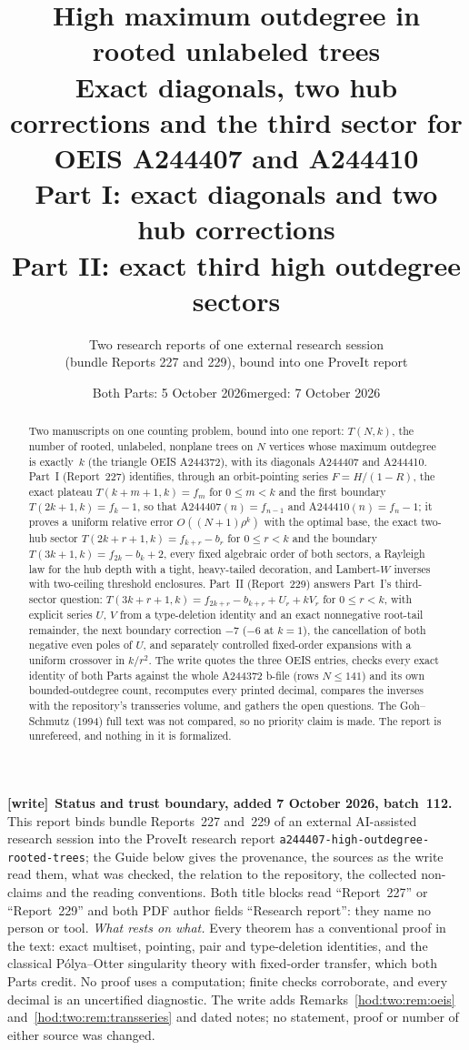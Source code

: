 \documentclass[11pt,letterpaper]{article}
\title{High maximum outdegree in rooted unlabeled trees\\[4pt]\large Exact diagonals, two hub corrections and the third sector for OEIS A244407 and A244410\\[8pt]
\normalsize Part I: exact diagonals and two hub corrections\\[2pt]
Part II: exact third high outdegree sectors}
\author{Two research reports of one external research session\\(bundle Reports 227 and 229), bound into one ProveIt report}
\date{Both Parts: 5 October 2026\quad merged: 7 October 2026}
\theoremstyle{definition}\newtheorem{definition}[theorem]{Definition}
\theoremstyle{remark}\newtheorem{remark}[theorem]{Remark}
\newcommand{\file}[1]{\nolinkurl{#1}}
\newenvironment{writenote}[1][]{\par\smallskip\begingroup\small
 \noindent\textbf{[write]}\if\relax\detokenize{#1}\relax\else~\textbf{#1.}\fi\ }%
 {\par\endgroup\smallskip}
\begin{document}
\hypersetup{pageanchor=false}
\maketitle
\begin{abstract}
Two manuscripts on one counting problem, bound into one report: $T(N,k)$, the number of rooted, unlabeled, nonplane trees on $N$ vertices whose maximum outdegree is exactly~$k$ (the triangle OEIS A244372), with its diagonals A244407 and A244410. Part~I (Report~227) identifies, through an orbit-pointing series $F=H/(1-R)$, the exact plateau $T(k+m+1,k)=f_m$ for $0\le m<k$ and the first boundary $T(2k+1,k)=f_k-1$, so that $\mathrm{A244407}(n)=f_{n-1}$ and $\mathrm{A244410}(n)=f_n-1$; it proves a uniform relative error $O((N+1)\rho^k)$ with the optimal base, the exact two-hub sector $T(2k+r+1,k)=f_{k+r}-b_r$ for $0\le r<k$ and the boundary $T(3k+1,k)=f_{2k}-b_k+2$, every fixed algebraic order of both sectors, a Rayleigh law for the hub depth with a tight, heavy-tailed decoration, and Lambert-$W$ inverses with two-ceiling threshold enclosures. Part~II (Report~229) answers Part~I's third-sector question: $T(3k+r+1,k)=f_{2k+r}-b_{k+r}+U_r+kV_r$ for $0\le r<k$, with explicit series $U$, $V$ from a type-deletion identity and an exact nonnegative root-tail remainder, the next boundary correction $-7$ ($-6$ at $k=1$), the cancellation of both negative even poles of $U$, and separately controlled fixed-order expansions with a uniform crossover in $k/r^2$. The write quotes the three OEIS entries, checks every exact identity of both Parts against the whole A244372 b-file (rows $N\le141$) and its own bounded-outdegree count, recomputes every printed decimal, compares the inverses with the repository's transseries volume, and gathers the open questions. The Goh--Schmutz (1994) full text was not compared, so no priority claim is made. The report is unrefereed, and nothing in it is formalized.
\end{abstract}
\begin{writenote}[Status and trust boundary, added 7 October 2026, batch~112]
This report binds bundle Reports~227 and~229 of an external AI-assisted
research session into the ProveIt research report
\file{a244407-high-outdegree-rooted-trees}; the Guide below gives the
provenance, the sources as the write read them, what was checked, the relation
to the repository, the collected non-claims and the reading conventions. Both
title blocks read ``Report~227'' or ``Report~229'' and both PDF author fields
``Research report'': they name no person or tool. \emph{What rests on what.}
Every theorem has a conventional proof in the text: exact multiset, pointing,
pair and type-deletion identities, and the classical P\'olya--Otter
singularity theory with fixed-order transfer, which both Parts credit. No proof
uses a computation; finite checks corroborate, and every decimal is an
uncertified diagnostic. The write adds Remarks~\ref{hod:two:rem:oeis}
and~\ref{hod:two:rem:transseries} and dated notes; no statement, proof or
number of either source was changed.
\end{writenote}
\hypersetup{pageanchor=true}
{\small\setcounter{tocdepth}{1}\tableofcontents}
\clearpage
\end{document}
